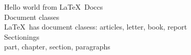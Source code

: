 \documentclass[a4paper, 12pt]{article}
\begin{document}
	Hello world from \LaTeX\ Doccs\\
    
    Document classes\\
    \LaTeX\ has  document clasess: articles, letter, book, report\\
    
    Sectionings\\
    part, chapter, section, paragraphs\\
\end{document}
